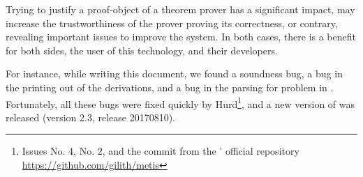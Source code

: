 \documentclass[main.tex]{subfiles}
\begin{document}
Trying to justify a proof-object of a theorem prover has a
significant impact, may increase the trustworthiness of the prover
proving its correctness, or contrary, revealing important issues to
improve the system. In both cases, there is a benefit for both
sides, the user of this technology, and their developers.

For instance, while writing this document, we found a soundness bug,
a bug in the printing out of the \TSTP derivations, and a bug in the
parsing for \TPTP problem in \Metis. Fortunately, all these bugs
were fixed quickly by Hurd\footnote{Issues No. 4, No. 2, and the
commit  from the \Metis' official repository
\url{https://github.com/gilith/metis}}, and a new version of \Metis
was released (version 2.3, release 20170810).

\end{document}
